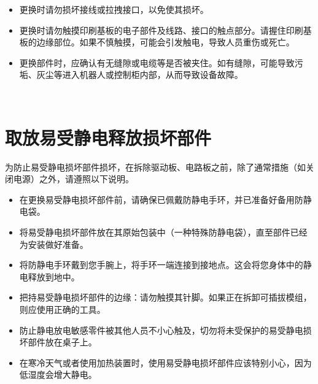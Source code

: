 \documentclass[a4paper,11pt,english,openany,oneside]{sphinxmanual}
\begin{document}
\begin{savenotes}
\begin{tabular}[t]{}
\begin{varwidth}[t]{}
\begin{itemize}
\item {} 
\sphinxAtStartPar
更换时请勿损坏接线或拉拽接口，以免使其损坏。

\item {} 
\sphinxAtStartPar
更换时请勿触摸印刷基板的电子部件及线路、接口的触点部分。请握住印刷基板的边缘部位。如果不慎触摸，可能会引发触电，导致人员重伤或死亡。

\item {} 
\sphinxAtStartPar
更换部件时，应确认有无缝隙或电缆等是否被夹住。如有缝隙，可能导致污垢、灰尘等进入机器人或控制柜内部，从而导致设备故障。

\end{itemize}
\sphinxbeforeendvarwidth
\end{varwidth}%
\\
\sphinxbottomrule
\end{tabular}
\sphinxtableafterendhook\par
\sphinxattableend\end{savenotes}


\section{取放易受静电释放损坏部件}
\label{\detokenize{_u5b89_u5168_u89c4_u8303:id5}}
\begin{figure}[H]
\centering

\noindent{}
\end{figure}

\sphinxAtStartPar
为防止易受静电损坏部件损坏，在拆除驱动板、电路板之前，除了通常措施（如关闭电源）之外，请遵照以下说明。
\begin{itemize}
\item {} 
\sphinxAtStartPar
在更换易受静电损坏部件前，请确保已佩戴防静电手环，并已准备好备用防静电袋。

\item {} 
\sphinxAtStartPar
将易受静电损坏部件放在其原始包装中（一种特殊防静电袋），直至部件已经为安装做好准备。

\item {} 
\sphinxAtStartPar
将防静电手环戴到您手腕上，将手环一端连接到接地点。这会将您身体中的静电释放到地中。

\item {} 
\sphinxAtStartPar
把持易受静电损坏部件的边缘：请勿触摸其针脚。如果正在拆卸可插拔模组，则应使用正确的工具。

\item {} 
\sphinxAtStartPar
防止静电放电敏感零件被其他人员不小心触及，切勿将未受保护的易受静电损坏部件放在桌子上。

\item {} 
\sphinxAtStartPar
在寒冷天气或者使用加热装置时，使用易受静电损坏部件应该特别小心，因为低湿度会增大静电。

\end{itemize}
\end{document}
